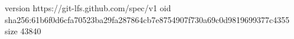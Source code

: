 version https://git-lfs.github.com/spec/v1
oid sha256:61b6f0d6cfa70523ba29fa287864cb7e8754907f730a69c0d9819699377c4355
size 43840
